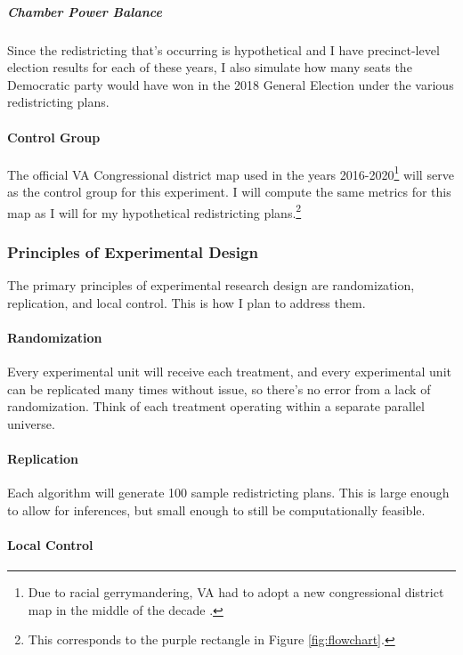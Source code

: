\subparagraph{Chamber Power Balance}

Since the redistricting that's occurring is hypothetical and I have precinct-level election results for each of these years, I also simulate how many seats the Democratic party would have won in the 2018 General Election under the various redistricting plans. 

\paragraph{Control Group}

The official VA Congressional district map used in the years 2016-2020\footnote{Due to racial gerrymandering, VA had to adopt a new congressional district map in the middle of the decade \parencite{breyer2016}.} will serve as the control group for this experiment. I will compute the same metrics for this map as I will for my hypothetical redistricting plans.\footnote{This corresponds to the purple rectangle in Figure \ref{fig:flowchart}.}

\subsubsection{Principles of Experimental Design}

The primary principles of experimental research design are randomization, replication, and local control. This is how I plan to address them. 

\paragraph{Randomization}

Every experimental unit will receive each treatment, and every experimental unit can be replicated many times without issue, so there’s no error from a lack of randomization. Think of each treatment operating within a separate parallel universe. 

\paragraph{Replication}

Each algorithm will generate 100 sample redistricting plans. This is large enough to allow for inferences, but small enough to still be computationally feasible. 

\paragraph{Local Control}

